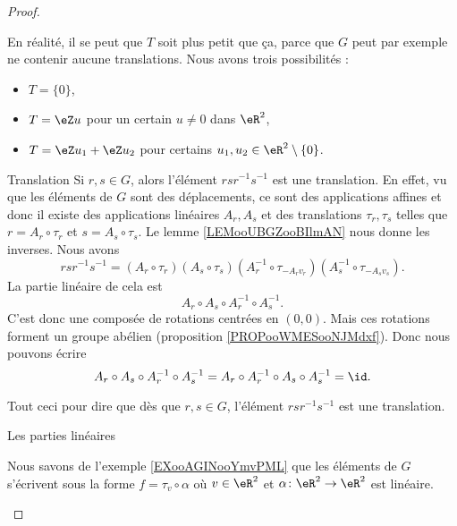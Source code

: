 \begin{proof}
\begin{subproof}
            En réalité, il se peut que \( T\) soit plus petit que ça, parce que \( G\) peut par exemple ne contenir aucune translations. Nous avons trois possibilités :
            \begin{itemize}
                \item \( T=\{ 0 \}\),
                \item \( T=\eZ u\) pour un certain \( u\neq 0\) dans \( \eR^2\),
                \item \( T=\eZ u_1+\eZ u_2\) pour certains \( u_1,u_2\in \eR^2\setminus\{ 0 \}\).
            \end{itemize}
        \item[Translation]
            Si \( r,s\in G\), alors l'élément \( rsr^{-1}s^{-1}\) est une translation. En effet, vu que les éléments de \( G\) sont des déplacements, ce sont des applications affines et donc il existe des applications linéaires \( A_r,A_s\) et des translations \( \tau_r,\tau_s\) telles que \( r=A_r\circ \tau_r\) et \( s=A_s\circ \tau_s\). Le lemme \ref{LEMooUBGZooBIlmAN} nous donne les inverses. Nous avons
            \begin{equation}
                rsr^{-1}s^{-1}=(A_r\circ \tau_r)(A_s\circ \tau_s)(A_r^{-1}\circ \tau_{-A_rv_r})(A_s^{-1}\circ \tau_{-A_sv_s}).
            \end{equation}
            La partie linéaire de cela est
            \begin{equation}
                A_r\circ A_s\circ A_r^{-1}\circ A_s^{-1}.
            \end{equation}
            C'est donc une composée de rotations centrées en \( (0,0)\). Mais ces rotations forment un groupe abélien (proposition \ref{PROPooWMESooNJMdxf}). Donc nous pouvons écrire
            \begin{equation}
                A_r\circ A_s\circ A_r^{-1}\circ A_s^{-1}=A_r\circ A_r^{-1}\circ A_s\circ A_s^{-1}=\id.
            \end{equation}

            Tout ceci pour dire que dès que \( r,s\in G\), l'élément \( rsr^{-1} s^{-1}\) est une translation.

        \item[Les parties linéaires\cite{MonCerveau}]

            Nous savons de l'exemple \ref{EXooAGINooYmvPML} que les éléments de \( G\) s'écrivent sous la forme \( f=\tau_v\circ \alpha\) où \( v\in \eR^2\) et \( \alpha\colon \eR^2\to \eR^2\) est linéaire.


\end{subproof}
\end{proof}
